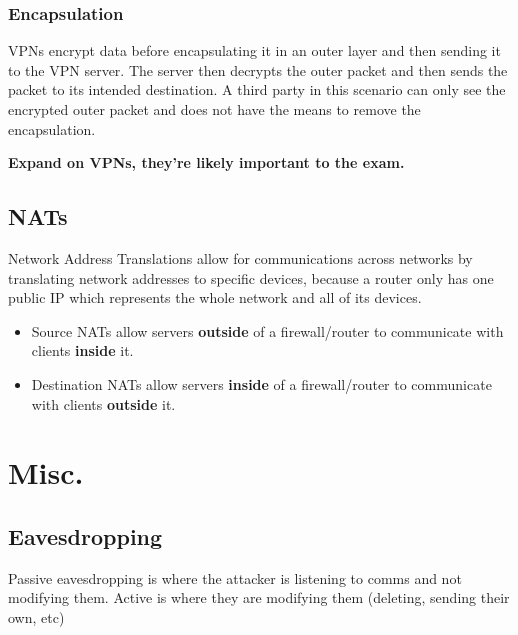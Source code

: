 \documentclass[12pt]{report}
\begin{document}
\subsection{Encapsulation}
VPNs encrypt data before encapsulating it in an outer layer and then sending it to the VPN server. The server then decrypts the outer packet and then sends the packet to its intended destination. A third party in this scenario can only see the encrypted outer packet and does not have the means to remove the encapsulation.

\large\textbf{Expand on VPNs, they're likely important to the exam.}\normalsize

\section{NATs}
Network Address Translations allow for communications across networks by translating network addresses to specific devices,
because a router only has one public IP which represents the whole network and all of its devices.

\begin{multicols}{2}
	\begin{itemize}
		\item Source NATs allow servers \textbf{outside} of a firewall/router to communicate with clients \textbf{inside} it.
		\item Destination NATs allow servers \textbf{inside} of a firewall/router to communicate with clients \textbf{outside} it.
	\end{itemize}
\end{multicols}

\chapter*{Misc.}
\addtocounter{chapter}{-11}
\section{Eavesdropping}
Passive eavesdropping is where the attacker is listening to comms and not modifying them. Active is where they are modifying them (deleting, sending their own, etc)
\end{document}
